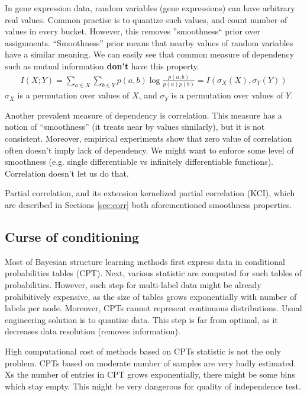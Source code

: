 \documentclass{article} %
\begin{document}
In gene expression data, random variables (gene expressions) can 
have arbitrary real values. Common practise is to quantize such values,
and count number of values in every bucket. However, this removes 
''smoothness`` prior over assignments. ``Smoothness'' prior means that
nearby values of random variables have a similar meaning. We can easily see
that common measure of dependency such as mutual information {\bf don't} have 
this property. 
\begin{align*}
  I(X;Y)=\sum_{a \in X}\sum_{b \in Y} p(a, b)\log{\frac{p(a, b)}{p(a)p(b)}}=I(\sigma_X(X), \sigma_Y(Y))
\end{align*}
$\sigma_X$ is a permutation over values of $X$, and $\sigma_Y$ is
a permutation over values of $Y$.


Another prevalent measure of dependency is correlation. This measure
has a notion of ``smoothness'' (it treats near by values similarly), but
it is not consistent. Moreover, empirical experiments show that zero value
of correlation often doesn't imply lack of dependency. We might want to 
enforce some level of smoothness (e.g. single differentiable vs infinitely 
differentiable functions). Correlation doesn't let us do that. 

Partial correlation, and its extension kernelized partial correlation (KCI), which are described 
in Sections \ref{sec:corr} both aforementioned smoothness properties.


\subsection{Curse of conditioning}\label{sec:curse}
Most of Bayesian structure learning methods first express data in conditional probabilities tables (CPT).
Next, various statistic are computed for such tables of probabilities. However, such step
for multi-label data might be already prohibitively expensive, as the size of tables grows
exponentially with number of labels per node. Moreover, CPTs cannot represent continuous
distributions. Usual engineering solution is to quantize data. This step is far from optimal,
as it decreases data resolution (removes information). 


High computational cost of methods based on CPTs statistic is not the only problem. 
CPTs based on moderate number of samples are very badly estimated. Xs the number
of entries in CPT grows exponentially, there might be some bins which stay empty. This might
be very dangerous for quality of independence test.
\end{document}
